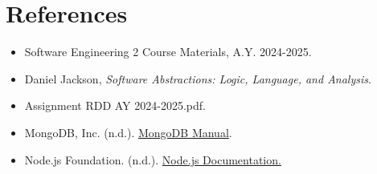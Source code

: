 \section{References}
\label{sec:references}%

\begin{itemize}
    \item Software Engineering 2 Course Materials, A.Y. 2024-2025.
    \item Daniel Jackson, \textit{Software Abstractions: Logic, Language, and Analysis}.
    \item Assignment RDD AY 2024-2025.pdf.
    \item  MongoDB, Inc. (n.d.). \href{https://www.mongodb.com/docs/manual/}{MongoDB Manual}.
    \item Node.js Foundation. (n.d.). \href{https://nodejs.org/en/docs/}{Node.js Documentation.}

\end{itemize}
